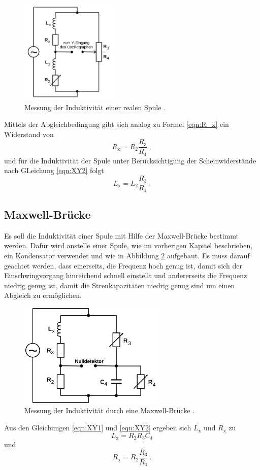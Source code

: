 \begin{figure}[H]
  \centering
  \includegraphics[height=5cm]{picture/4.png}
  \caption{Messung der Induktivität einer realen Spule \cite{sample}.}
  \label{fig:L}
\end{figure}
Mittels der Abgleichbedingung gibt sich analog zu Formel \ref{eqn:R_x} ein Widerstand von
\begin{equation*}
     R_\text{x} = R_2 \frac{R_3}{R_4} \ ,
\end{equation*}
und für die Induktivität der Spule unter Berücksichtigung der Scheinwiderstände nach GLeichung \ref{eqn:XY2} folgt
\begin{equation}
   L_\text{x} = L_2 \frac{R_3}{R_4} \ .
   \label{eqn:L_x}
\end{equation}
\subsection{Maxwell-Brücke}
Es soll die Induktivität einer Spule mit Hilfe der Maxwell-Brücke bestimmt werden. Dafür wird anstelle einer Spule, wie im vorherigen Kapitel beschrieben, ein Kondensator verwendet und wie in Abbildung \ref{fig:Max-Br} aufgebaut. Es muss darauf geachtet werden, dass einerseits, die Frequenz hoch genug ist, damit sich der Einschwingvorgang hinreichend schnell einstellt und andererseits die Frequenz niedrig genug ist, damit die Streukapazitäten niedrig genug sind um einen Abgleich zu ermöglichen.
\begin{figure}
  \centering
  \includegraphics[height=5cm]{picture/5.png}
  \caption{Messung der Induktivität durch eine Maxwell-Brücke \cite{sample}.}
  \label{fig:Max-Br}
\end{figure}
Aus den Gleichungen \ref{eqn:XY1} und \ref{eqn:XY2} ergeben sich $L_\text{x}$ und $R_\text{x}$ zu
\begin{equation}
  L_\text{x} = R_2 R_3 C_4
  \label{eqn:L_m}
\end{equation}
und
\begin{equation*}
  R_\text{x} = R_2 \frac{R_3}{R_4} \ .
\end{equation*}

